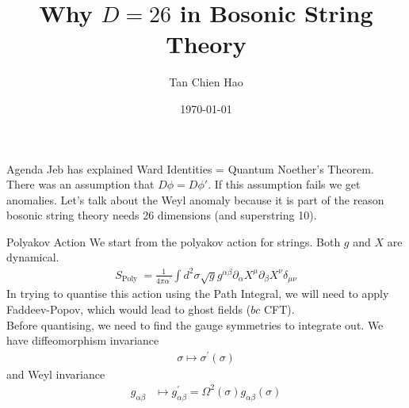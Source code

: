 \documentclass{beamer}
\title{Why $D=26$ in Bosonic String Theory}
\author{Tan Chien Hao}
\institute{\url{www.tchlabs.net} \\ @tch1001}
\date{\today}
\begin{document}
\frame{\titlepage}

\begin{frame}{Agenda}
Jeb has explained Ward Identities = Quantum Noether's Theorem. There was an assumption that $D\phi = D\phi'$. If this assumption fails we get anomalies. Let's talk about the Weyl anomaly because it is part of the reason bosonic string theory needs 26 dimensions (and superstring 10).
\end{frame}
\begin{frame}{Polyakov Action}
We start from the polyakov action for strings. Both $g$ and $X$ are dynamical.
    \begin{align}
        S_{\text {Poly }}=\frac{1}{4 \pi \alpha^{\prime}} \int d^2 \sigma \sqrt{g} g^{\alpha \beta} \partial_\alpha X^\mu \partial_\beta X^\nu \delta_{\mu \nu}
    \end{align}
    In trying to quantise this action using the Path Integral, we will need to apply Faddeev-Popov, which would lead to ghost fields ($bc$ CFT). 
    \newline \\ 
    Before quantising, we need to find the gauge symmetries to integrate out. We have diffeomorphism invariance
    \begin{align}
        \sigma \mapsto \sigma^{\prime}(\sigma) 
    \end{align}
    and Weyl invariance
    \begin{align}
        g_{\alpha \beta} & \mapsto g_{\alpha \beta}^{\prime}=\Omega^2(\sigma) g_{\alpha \beta}(\sigma) 
    \end{align}
\end{frame}
\end{document}
